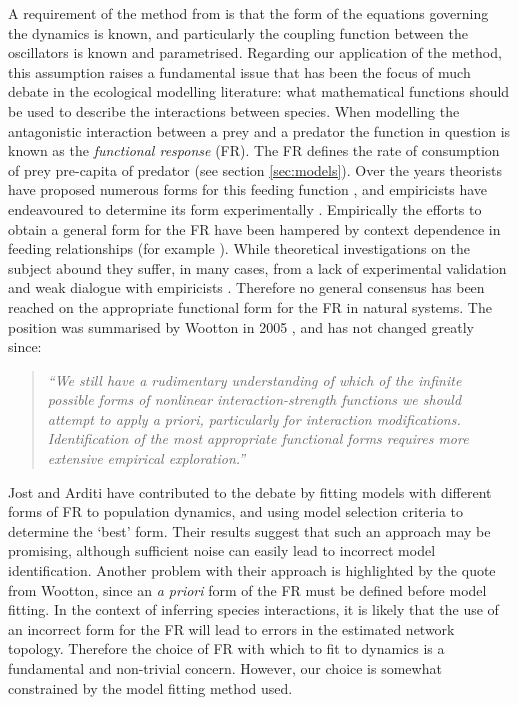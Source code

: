 A requirement of the method from \cite{shandilya2011inferring} is that the form of the equations governing the dynamics is known, and particularly the coupling function between the oscillators is known and parametrised. Regarding our application of the method, this assumption raises a fundamental issue that has been the focus of much debate in the ecological modelling literature: what mathematical functions should be used to describe the interactions between species. When modelling the antagonistic interaction between a prey and a predator the function in question is known as the \emph{functional response} (FR). The FR defines the rate of consumption of prey pre-capita of predator (see section \ref{sec:models}). Over the years theorists have proposed numerous forms for this feeding function \cite{holling1959some,arditi2012species,hwang2003global,jost2000identifying}, and empiricists have endeavoured to determine its form experimentally \cite{sarnelle2008type,schenk2002functional}. Empirically the efforts to obtain a general form for the FR have been hampered by context dependence in feeding relationships (for example \cite{englund2011temperature,zamani2006temperature}). While theoretical investigations on the subject abound they suffer, in many cases, from a lack of experimental validation and weak dialogue with empiricists \cite{berlow2004interaction,barraquand2014functional}. Therefore no general consensus has been reached on the appropriate functional form for the FR in natural systems. The position was summarised by Wootton in 2005 \citep{wootton2005measurement}, and has not changed greatly since:

\begin{quote}
\emph{``We still have a rudimentary understanding of which of the infinite possible forms of nonlinear interaction-strength functions we should attempt to apply a priori, particularly for  interaction modifications. Identification of the most appropriate functional forms requires more extensive empirical exploration.''}  
\end{quote}

Jost and Arditi have contributed to the debate \cite{jost2000identifying} by fitting models with different forms of FR to population dynamics, and using model selection criteria to determine the `best' form. Their results suggest that such an approach may be promising, although sufficient noise can easily lead to incorrect model identification. Another problem with their approach is highlighted by the quote from Wootton, since an \emph{a priori} form of the FR must be defined before model fitting. In the context of inferring species interactions, it is likely that the use of an incorrect form for the FR will lead to errors in the estimated network topology. Therefore the choice of FR with which to fit to dynamics is a fundamental and non-trivial concern. However, our choice is somewhat constrained by the model fitting method used.


